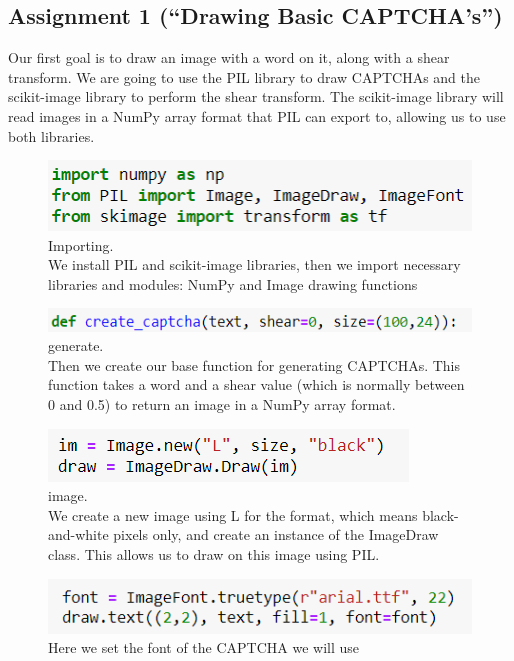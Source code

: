 \documentclass[onecolumn]{article}
\begin{document}
\subsection{Assignment 1 (``Drawing Basic CAPTCHA's'')}

Our first goal is to draw an image with a word on it, along with a shear transform. We are going to use the PIL library to draw CAPTCHAs and the scikit-image library to perform the shear transform. The scikit-image library will read images in a NumPy array format that PIL can export to, allowing us to use both libraries.

\begin{figure}[h]
    \centering
    \includegraphics[width=.5\linewidth]{1..png}
\caption{\label{fig:demo-bad}
\centering
Importing.\\We install PIL and scikit-image libraries, then we import necessary libraries and modules: NumPy  and Image drawing functions}
\end{figure}

\begin{figure}[h]
    \centering
    \includegraphics[width=.5\linewidth]{2..png}
\caption{\label{fig:demo-bad}
\centering
generate.\\Then we create our base function for generating CAPTCHAs. This function takes a word and a shear value (which is normally between 0 and 0.5) to return an image in a NumPy array format.}
\end{figure}

\begin{figure}[h]
    \centering
    \includegraphics[width=.5\linewidth]{3..png}
\caption{\label{fig:demo-bad}
\centering
image.\\We create a new image using L for the format, which means black-and-white pixels only, and create an instance of the ImageDraw class. This allows us to draw on this
image using PIL.}
\end{figure}

\begin{figure}[hb!]
    \centering
    \includegraphics[width=.5\linewidth]{4..png}
\caption{\label{fig:demo-bad}
\centering
Here we set the font of the CAPTCHA we will use}
\end{figure}
\end{document}

